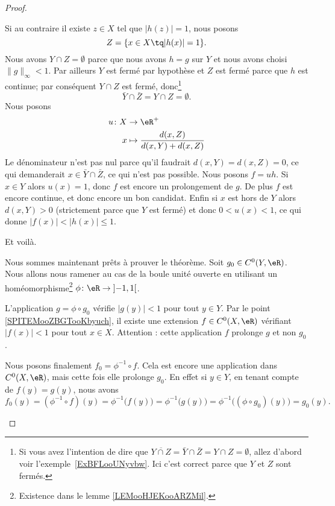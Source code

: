 \begin{proof}
\begin{subproof}
		Si au contraire il existe \( z\in X\) tel que \( | h(z)|=1 \), nous posons
		\begin{equation}		\label{EQooIVXAooZQZxlq}
			Z=\{ x\in X\tq | h(x) |=1 \}.
		\end{equation}
		Nous avons \( Y\cap Z=\emptyset\) parce que nous avons \( h=g\) sur \( Y\) et nous avons choisi \( \| g \|_{\infty}<1\). Par ailleurs \( Y\) est fermé par hypothèse et \( Z\) est fermé parce que \( h\) est continue; par conséquent \( Y\cap Z\) est fermé, donc\footnote{Si vous avez l'intention de dire que \( \overline{ Y\cap Z }=\bar Y\cap\bar Z=Y\cap Z=\emptyset\), allez d'abord voir l'exemple~\ref{ExBFLooUNyvbw}. Ici c'est correct parce que \( Y\) et \( Z\) sont fermés.}
		\begin{equation}
			\bar Y\cap\bar Z=Y\cap Z=\emptyset.
		\end{equation}
		Nous posons
		\begin{equation}
			\begin{aligned}
				u\colon X & \to \eR^+                                \\
				x         & \mapsto \frac{ d(x,Z) }{ d(x,Y)+d(x,Z) }
			\end{aligned}
		\end{equation}
		Le dénominateur n'est pas nul parce qu'il faudrait \( d(x,Y)=d(x,Z)=0\), ce qui demanderait \( x\in \bar Y\cap\bar Z\), ce qui n'est pas possible. Nous posons \( f=uh\). Si \( x\in Y\) alors \( u(x)=1\), donc \( f\) est encore un prolongement de \( g\). De plus \( f\) est encore continue, et donc encore un bon candidat. Enfin si \( x\) est hors de \( Y\) alors \( d(x,Y)>0\) (strictement parce que \( Y\) est fermé) et donc \( 0<u(x)<1\), ce qui donne \( | f(x) |<| h(x) |\leq 1\).

		Et voilà.


		Nous sommes maintenant prêts à prouver le théorème. Soit \( g_0\in C^0(Y,\eR)\). Nous allons nous ramener au cas de la boule unité ouverte en utilisant un homéomorphisme\footnote{Existence dans le lemme \ref{LEMooHJEKooARZMil}.} \( \phi\colon \eR\to \mathopen] -1 , 1 \mathclose[\).

		L'application \( g=\phi\circ g_0\) vérifie \( | g(y) |<1\) pour tout \( y\in Y\). Par le point \ref{SPITEMooZBGTooKbyuch}, il existe une extension \( f\in C^0(X,\eR)\) vérifiant \( | f(x) |<1\) pour tout \( x\in X\). Attention : cette application \( f\) prolonge \( g\) et non \( g_0\).

		Nous posons finalement \( f_0=\phi^{-1}\circ f\). Cela est encore une application dans \( C^0(X,\eR)\), mais cette fois elle prolonge \( g_0\). En effet si \( y\in Y\), en tenant compte de \( f(y)=g(y)\), nous avons
		\begin{equation}
			f_0(y)=(\phi^{-1}\circ f)(y)=\phi^{-1}\big( f(y) \big)=\phi^{-1}\big( g(y) \big)=\phi^{-1}\big( (\phi\circ g_0)(y) \big)=g_0(y).
		\end{equation}
	\end{subproof}
\end{proof}

